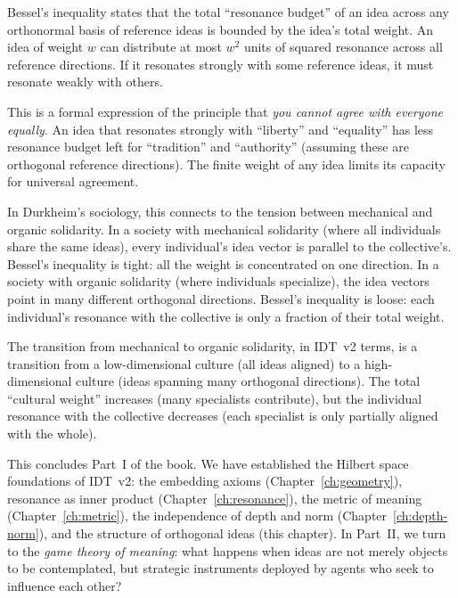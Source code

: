 \begin{interpretation}
\label{interp:bessel}
Bessel's inequality states that the total ``resonance budget'' of an idea
across any orthonormal basis of reference ideas is bounded by the idea's total
weight. An idea of weight $w$ can distribute at most $w^2$ units of squared
resonance across all reference directions. If it resonates strongly with some
reference ideas, it must resonate weakly with others.

This is a formal expression of the principle that \emph{you cannot agree with
everyone equally}. An idea that resonates strongly with ``liberty'' and
``equality'' has less resonance budget left for ``tradition'' and ``authority''
(assuming these are orthogonal reference directions). The finite weight of any
idea limits its capacity for universal agreement.

In Durkheim's sociology, this connects to the tension between mechanical and
organic solidarity. In a society with mechanical solidarity (where all
individuals share the same ideas), every individual's idea vector is parallel
to the collective's. Bessel's inequality is tight: all the weight is
concentrated on one direction. In a society with organic solidarity (where
individuals specialize), the idea vectors point in many different orthogonal
directions. Bessel's inequality is loose: each individual's resonance with the
collective is only a fraction of their total weight.

The transition from mechanical to organic solidarity, in IDT~v2 terms, is a
transition from a low-dimensional culture (all ideas aligned) to a
high-dimensional culture (ideas spanning many orthogonal directions). The
total ``cultural weight'' increases (many specialists contribute), but the
individual resonance with the collective decreases (each specialist is only
partially aligned with the whole).
\end{interpretation}

\bigskip

This concludes Part~I of the book. We have established the Hilbert space
foundations of IDT~v2: the embedding axioms
(Chapter~\ref{ch:geometry}), resonance as inner product
(Chapter~\ref{ch:resonance}), the metric of meaning (Chapter~\ref{ch:metric}),
the independence of depth and norm (Chapter~\ref{ch:depth-norm}), and the
structure of orthogonal ideas (this chapter). In Part~II, we turn to the
\emph{game theory of meaning}: what happens when ideas are not merely objects
to be contemplated, but strategic instruments deployed by agents who seek to
influence each other?
